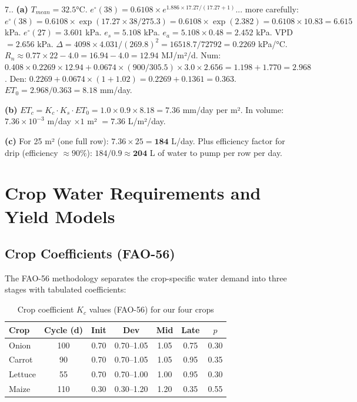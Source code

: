 \documentclass[12pt,a4paper,openany]{book}
\newcounter{exoctr}[chapter]
\renewcommand{\theexoctr}{\thechapter.\arabic{exoctr}}
\begin{document}
\begin{solbox}{7.\theexoctr}
\textbf{(a)} $T_{mean}=32.5$°C. $e^{\circ}(38)=0.6108\times e^{1.886\times17.27/(17.27+1)}$... more carefully:
$e^{\circ}(38)=0.6108\times\exp(17.27\times38/275.3)=0.6108\times\exp(2.382)=0.6108\times10.83=6.615$ kPa.
$e^{\circ}(27)=3.601$ kPa. $e_s=5.108$ kPa. $e_a=5.108\times0.48=2.452$ kPa. VPD$=2.656$ kPa.
$\Delta=4098\times4.031/(269.8)^2=16518.7/72792=0.2269$ kPa/°C.
$R_n\approx0.77\times22-4.0=16.94-4.0=12.94$ MJ/m²/d.
Num: $0.408\times0.2269\times12.94+0.0674\times(900/305.5)\times3.0\times2.656=1.198+1.770=2.968$.
Den: $0.2269+0.0674\times(1+1.02)=0.2269+0.1361=0.363$.
$ET_0=2.968/0.363=\mathbf{8.18}$ mm/day.

\textbf{(b)} $ET_c=K_c\cdot K_s\cdot ET_0=1.0\times0.9\times8.18=7.36$ mm/day per m². In volume: $7.36\times10^{-3}$ m/day $\times 1$ m² $= 7.36$ L/m²/day.

\textbf{(c)} For 25 m² (one full row): $7.36\times25=\mathbf{184}$ L/day. Plus efficiency factor for drip (efficiency $\approx90\%$): $184/0.9\approx\mathbf{204}$ L of water to pump per row per day.
\end{solbox}

\chapter{Crop Water Requirements and Yield Models}
\label{chap:crop}

\section{Crop Coefficients (FAO-56)}

The FAO-56 methodology separates the crop-specific water demand into three stages with tabulated coefficients:

\begin{table}[H]
\centering
\caption{Crop coefficient $K_c$ values (FAO-56) for our four crops}
\label{tab:Kc}
\renewcommand{\arraystretch}{1.3}
\begin{tabular}{lcccccc}
\toprule
\textbf{Crop}&\textbf{Cycle (d)}&\textbf{Init}&\textbf{Dev}&\textbf{Mid}&\textbf{Late}&$p$\\
\midrule
Onion & 100 & 0.70 & 0.70--1.05 & 1.05 & 0.75 & 0.30\\
Carrot & 90 & 0.70 & 0.70--1.05 & 1.05 & 0.95 & 0.35\\
Lettuce & 55 & 0.70 & 0.70--1.00 & 1.00 & 0.95 & 0.30\\
Maize & 110 & 0.30 & 0.30--1.20 & 1.20 & 0.35 & 0.55\\
\bottomrule
\end{tabular}
\end{table}
\end{document}
